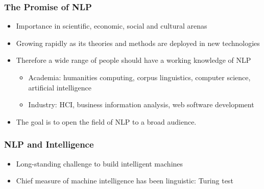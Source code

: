 

\begin{frame}[fragile]\frametitle{The Promise of NLP}
\begin{itemize}
\item Importance in scientific, economic, social and cultural arenas
\item Growing rapidly as its theories and methods are deployed in new technologies
\item Therefore a wide range of people should have a working knowledge of NLP
  \begin{itemize}
  \item Academia: humanities computing, corpus linguistics, computer science, artificial intelligence
  \item Industry: HCI, business information analysis, web software development
  \end{itemize}
\item The goal is to open the field of NLP to a broad audience.
\end{itemize}
\end{frame}

\begin{frame}[fragile]\frametitle{NLP and Intelligence}
\begin{itemize}
\item Long-standing challenge to build intelligent machines
\item Chief measure of machine intelligence has been linguistic: Turing test
\end{itemize}
\end{frame}

